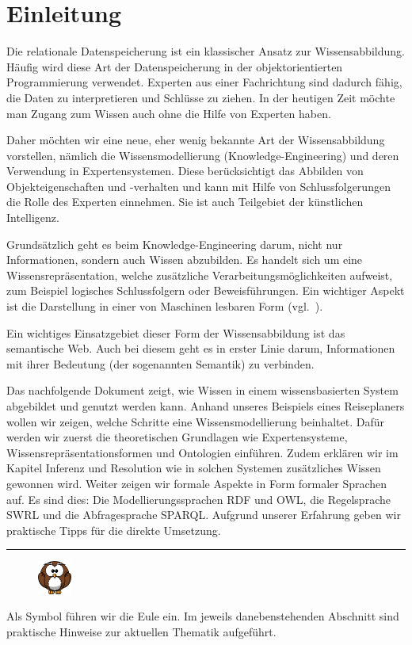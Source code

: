 \chapter{Einleitung}
\label{chap:einleitung}
Die relationale Datenspeicherung ist ein klassischer Ansatz zur Wissensabbildung. Häufig wird diese Art der Datenspeicherung in der objektorientierten Programmierung verwendet. Experten aus einer Fachrichtung sind dadurch fähig, die Daten zu interpretieren und Schlüsse zu ziehen. In der heutigen Zeit möchte man Zugang zum Wissen auch ohne die Hilfe von Experten haben. 

Daher möchten wir eine neue, eher wenig bekannte Art der Wissensabbildung vorstellen, nämlich die Wissensmodellierung (Knowledge-Engineering) und deren Verwendung in Expertensystemen. Diese berücksichtigt das Abbilden von Objekteigenschaften und -verhalten und kann mit Hilfe von Schlussfolgerungen die Rolle des Experten einnehmen. Sie ist auch Teilgebiet der künstlichen Intelligenz.

Grundsätzlich geht es beim Knowledge-Engineering darum, nicht nur Informationen, sondern auch Wissen abzubilden. Es handelt sich um eine Wissensrepräsentation, welche zusätzliche Verarbeitungsmöglichkeiten aufweist, zum Beispiel logisches Schlussfolgern oder Beweisführungen. Ein wichtiger Aspekt ist die Darstellung in einer von Maschinen lesbaren Form (vgl.~\cite[S. 308]{ISpekOntoGeschichte}).

Ein wichtiges Einsatzgebiet dieser Form der Wissensabbildung ist das semantische Web. Auch bei diesem geht es in erster Linie darum, Informationen mit ihrer Bedeutung (der sogenannten Semantik) zu verbinden.

Das nachfolgende Dokument zeigt, wie Wissen in einem wissensbasierten System abgebildet und genutzt werden kann. Anhand unseres Beispiels eines Reiseplaners wollen wir zeigen, welche Schritte eine Wissensmodellierung beinhaltet. Dafür werden wir zuerst die theoretischen Grundlagen wie Expertensysteme, Wissensrepräsentationsformen und Ontologien einführen. Zudem erklären wir im Kapitel Inferenz und Resolution wie in solchen Systemen zusätzliches Wissen gewonnen wird. Weiter zeigen wir formale Aspekte in Form formaler Sprachen auf. Es sind dies: Die Modellierungssprachen RDF und OWL, die Regelsprache SWRL und die Abfragesprache SPARQL. Aufgrund unserer Erfahrung geben wir praktische Tipps für die direkte Umsetzung.

\noindent\rule[1ex]{\textwidth}{1pt}
\begin{figure}
    \vspace{-12pt}
    \includegraphics[width=0.1\textwidth]{bilder/owl.png}\protect\footnotemark{}
\end{figure}
Als Symbol führen wir die Eule ein. Im jeweils danebenstehenden Abschnitt sind praktische Hinweise zur aktuellen Thematik aufgeführt.

